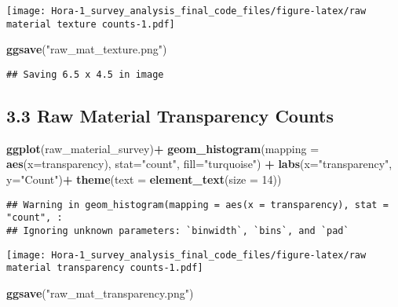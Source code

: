 \documentclass[
]{article}
\newenvironment{Shaded}{\begin{snugshade}}{\end{snugshade}}
\newcommand{\AttributeTok}[1]{\textcolor[rgb]{0.13,0.29,0.53}{#1}}
\newcommand{\DecValTok}[1]{\textcolor[rgb]{0.00,0.00,0.81}{#1}}
\newcommand{\FunctionTok}[1]{\textcolor[rgb]{0.13,0.29,0.53}{\textbf{#1}}}
\newcommand{\NormalTok}[1]{#1}
\newcommand{\SpecialCharTok}[1]{\textcolor[rgb]{0.81,0.36,0.00}{\textbf{#1}}}
\newcommand{\StringTok}[1]{\textcolor[rgb]{0.31,0.60,0.02}{#1}}
\begin{document}
\texttt{[image: Hora-1\_survey\_analysis\_final\_code\_files/figure-latex/raw material texture counts-1.pdf]}

\begin{Shaded}
\begin{Highlighting}[]
\FunctionTok{ggsave}\NormalTok{(}\StringTok{"raw\_mat\_texture.png"}\NormalTok{)}
\end{Highlighting}
\end{Shaded}

\begin{verbatim}
## Saving 6.5 x 4.5 in image
\end{verbatim}

\hypertarget{raw-material-transparency-counts}{%
\subsection{3.3 Raw Material Transparency
Counts}\label{raw-material-transparency-counts}}

\begin{Shaded}
\begin{Highlighting}[]
\FunctionTok{ggplot}\NormalTok{(raw\_material\_survey)}\SpecialCharTok{+}
  \FunctionTok{geom\_histogram}\NormalTok{(}\AttributeTok{mapping =} \FunctionTok{aes}\NormalTok{(}\AttributeTok{x=}\NormalTok{transparency), }\AttributeTok{stat=}\StringTok{"count"}\NormalTok{, }\AttributeTok{fill=}\StringTok{"turquoise"}\NormalTok{) }\SpecialCharTok{+}
  \FunctionTok{labs}\NormalTok{(}\AttributeTok{x=}\StringTok{"transparency"}\NormalTok{, }\AttributeTok{y=}\StringTok{"Count"}\NormalTok{)}\SpecialCharTok{+}
  \FunctionTok{theme}\NormalTok{(}\AttributeTok{text =} \FunctionTok{element\_text}\NormalTok{(}\AttributeTok{size =} \DecValTok{14}\NormalTok{))}
\end{Highlighting}
\end{Shaded}

\begin{verbatim}
## Warning in geom_histogram(mapping = aes(x = transparency), stat = "count", :
## Ignoring unknown parameters: `binwidth`, `bins`, and `pad`
\end{verbatim}

\texttt{[image: Hora-1\_survey\_analysis\_final\_code\_files/figure-latex/raw material transparency counts-1.pdf]}

\begin{Shaded}
\begin{Highlighting}[]
\FunctionTok{ggsave}\NormalTok{(}\StringTok{"raw\_mat\_transparency.png"}\NormalTok{)}
\end{Highlighting}
\end{Shaded}
\end{document}
